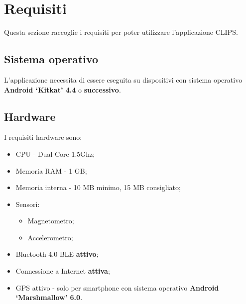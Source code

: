 \documentclass[../ClipsManualeUtente.tex]{subfiles}
\begin{document}
\section{Requisiti}
	Questa sezione raccoglie i requisiti per poter utilizzare l'applicazione CLIPS.
	
	\subsection{Sistema operativo}
		L'applicazione necessita di essere eseguita su dispositivi con sistema operativo \textbf{Android `Kitkat' 4.4} o \textbf{successivo}.
	
	\subsection{Hardware}
		I requisiti hardware sono:
		\begin{itemize}
			\item CPU - Dual Core 1.5Ghz;
			\item Memoria RAM - 1 GB;
			\item Memoria interna - 10 MB minimo, 15 MB consigliato;
			\item Sensori:
			\begin{itemize}
				\item Magnetometro;
				\item Accelerometro;
			\end{itemize}
			\item \gls{Bluetooth} 4.0 \gls{BLE} \textbf{attivo};
			\item Connessione a Internet \textbf{attiva};
			\item GPS attivo - solo per smartphone con sistema operativo \textbf{Android `Marshmallow' 6.0}.
		\end{itemize}
		
	
		
\end{document}
